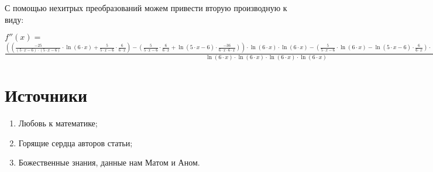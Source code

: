 \documentclass{article}
\begin{document}
С помощью нехитрых преобразований можем привести вторую производную к виду:

$f''(x) = $ $\frac{((\frac{-25}{(5 \cdot x - 6) \cdot (5 \cdot x - 6)} \cdot  \ln (6 \cdot x) + \frac{5}{5 \cdot x - 6} \cdot \frac{6}{6 \cdot x}) - (\frac{5}{5 \cdot x - 6} \cdot \frac{6}{6 \cdot x} +  \ln (5 \cdot x - 6) \cdot \frac{-36}{6 \cdot x \cdot 6 \cdot x})) \cdot  \ln (6 \cdot x) \cdot  \ln (6 \cdot x) - (\frac{5}{5 \cdot x - 6} \cdot  \ln (6 \cdot x) -  \ln (5 \cdot x - 6) \cdot \frac{6}{6 \cdot x}) \cdot (\frac{6}{6 \cdot x} \cdot  \ln (6 \cdot x) +  \ln (6 \cdot x) \cdot \frac{6}{6 \cdot x})}{ \ln (6 \cdot x) \cdot  \ln (6 \cdot x) \cdot  \ln (6 \cdot x) \cdot  \ln (6 \cdot x)}$\section*{Источники}
\begin{enumerate}
	\item Любовь к математике;
	\item Горящие сердца авторов статьи;
	\item Божественные знания, данные нам Матом и Аном.
\end{enumerate}
\end{document}
